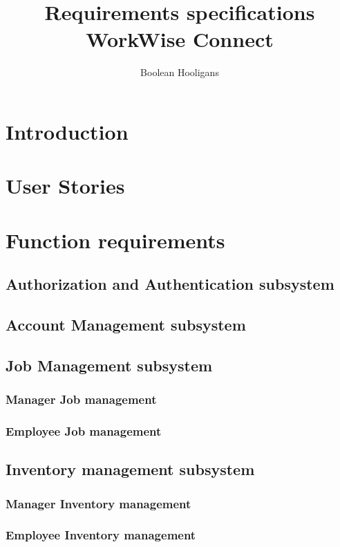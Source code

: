 \documentclass{article}
\title{%
	Requirements specifications \\
	\large WorkWise Connect}
\author{Boolean Hooligans}
\begin{document}
	
	\maketitle
	\newpage
	
	\section*{Introduction}	
	
	\newpage
	
	\section*{User Stories}
	
	\newpage
	
	\section*{Function requirements}
	\subsection*{Authorization and Authentication subsystem}	
	\subsection*{Account Management subsystem}	
	\subsection*{Job Management subsystem}	
	\subsubsection*{Manager Job management}	
	\subsubsection*{Employee Job management}	
	\subsection*{Inventory management subsystem}	
	\subsubsection*{Manager Inventory management}	
	\subsubsection*{Employee Inventory management}	
\end{document}
